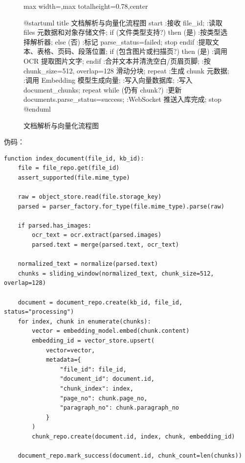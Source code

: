 \documentclass[a4paper,zihao=-4]{ctexart}
\begin{document}
\begin{figure}[H]
\centering
\begin{adjustbox}{max width=\linewidth,max totalheight=0.78\textheight,center}
\begingroup
\renewcommand{\PlantUMLJobname}{plantuml-diagrams/req-uml-07}
\begin{plantuml}
@startuml
title 文档解析与向量化流程图
start
:接收 file_id;
:读取 files 元数据和对象存储文件;
if (文件类型支持?) then (是)
  :按类型选择解析器;
else (否)
  :标记 parse_status=failed;
  stop
endif
:提取文本、表格、页码、段落位置;
if (包含图片或扫描页?) then (是)
  :调用 OCR 提取图片文字;
endif
:合并文本并清洗空白/页眉页脚;
:按 chunk_size=512, overlap=128 滑动分块;
repeat
  :生成 chunk 元数据;
  :调用 Embedding 模型生成向量;
  :写入向量数据库;
  :写入 document_chunks;
repeat while (仍有 chunk?)
:更新 documents.parse_status=success;
:WebSocket 推送入库完成;
stop
@enduml
\end{plantuml}
\endgroup
\end{adjustbox}
\caption{文档解析与向量化流程图}
\end{figure}

伪码：

\begin{lstlisting}
function index_document(file_id, kb_id):
    file = file_repo.get(file_id)
    assert_supported(file.mime_type)

    raw = object_store.read(file.storage_key)
    parsed = parser_factory.for_type(file.mime_type).parse(raw)

    if parsed.has_images:
        ocr_text = ocr.extract(parsed.images)
        parsed.text = merge(parsed.text, ocr_text)

    normalized_text = normalize(parsed.text)
    chunks = sliding_window(normalized_text, chunk_size=512, overlap=128)

    document = document_repo.create(kb_id, file_id, status="processing")
    for index, chunk in enumerate(chunks):
        vector = embedding_model.embed(chunk.content)
        embedding_id = vector_store.upsert(
            vector=vector,
            metadata={
                "file_id": file_id,
                "document_id": document.id,
                "chunk_index": index,
                "page_no": chunk.page_no,
                "paragraph_no": chunk.paragraph_no
            }
        )
        chunk_repo.create(document.id, index, chunk, embedding_id)

    document_repo.mark_success(document.id, chunk_count=len(chunks))
\end{lstlisting}
\end{document}
